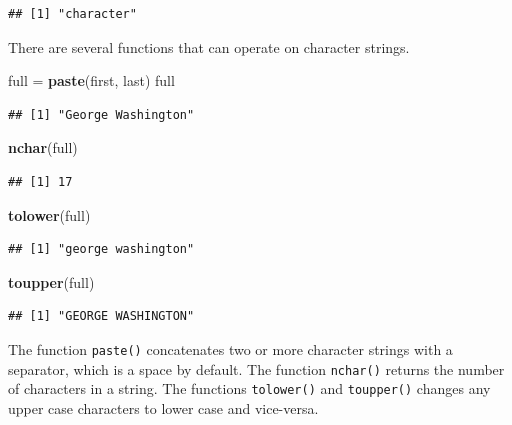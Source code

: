 \documentclass[
]{book}
\newenvironment{Shaded}{\begin{snugshade}}{\end{snugshade}}
\newcommand{\KeywordTok}[1]{\textcolor[rgb]{0.13,0.29,0.53}{\textbf{#1}}}
\newcommand{\NormalTok}[1]{#1}
\newcommand{\StringTok}[1]{\textcolor[rgb]{0.31,0.60,0.02}{#1}}
\begin{document}
\begin{verbatim}
## [1] "character"
\end{verbatim}

There are several functions that can operate on character strings.

\begin{Shaded}
\begin{Highlighting}[]
\NormalTok{full =}\StringTok{ }\KeywordTok{paste}\NormalTok{(first, last)}
\NormalTok{full }
\end{Highlighting}
\end{Shaded}

\begin{verbatim}
## [1] "George Washington"
\end{verbatim}

\begin{Shaded}
\begin{Highlighting}[]
\KeywordTok{nchar}\NormalTok{(full)}
\end{Highlighting}
\end{Shaded}

\begin{verbatim}
## [1] 17
\end{verbatim}

\begin{Shaded}
\begin{Highlighting}[]
\KeywordTok{tolower}\NormalTok{(full)}
\end{Highlighting}
\end{Shaded}

\begin{verbatim}
## [1] "george washington"
\end{verbatim}

\begin{Shaded}
\begin{Highlighting}[]
\KeywordTok{toupper}\NormalTok{(full)}
\end{Highlighting}
\end{Shaded}

\begin{verbatim}
## [1] "GEORGE WASHINGTON"
\end{verbatim}

The function \texttt{paste()} concatenates two or more character strings with a separator, which is a space by default. The function \texttt{nchar()} returns the number of characters in a string. The functions \texttt{tolower()} and \texttt{toupper()} changes any upper case characters to lower case and vice-versa.
\end{document}
